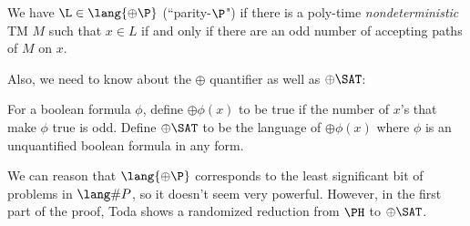 \newcommand{\Parity}{\oplus}
\newcommand{\ParityP}{\lang{\Parity\P}}
\begin{definition}
We have $\L \in \ParityP$ (``parity-$\P$") if there is a poly-time \emph{nondeterministic} TM $M$ such that $x \in L$ if and only if there are an odd number of accepting paths of $M$ on $x$. 
\end{definition}
\newcommand{\ParitySAT}{\Parity\SAT}
Also, we need to know about the $\Parity$ quantifier as well as $\ParitySAT$:
\begin{definition}
For a boolean formula $\phi$, define $\Parity\phi(x)$ to be true if the number of $x$'s that make $\phi$ true is odd. Define $\ParitySAT$ to be the language of $\Parity\phi(x)$ where $\phi$ is an unquantified boolean formula in any form.
\end{definition}
We can reason that $\ParityP$ corresponds to the least significant bit of problems in $\SharpP$, so it doesn't seem very powerful. However, in the first part of the proof, Toda shows a randomized reduction from $\PH$ to $\ParitySAT$. 
